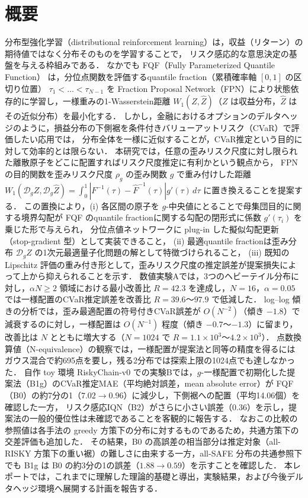 \documentclass[a4paper,10pt]{jsarticle}
\theoremstyle{definition}
\newcommand{\Wone}{W_1}
\newcommand{\Finv}{F^{-1}}
\newcommand{\Fhinv}{\hat{F}^{-1}}
\newcommand{\dist}{\mathcal{D}_g}
\begin{document}
\section*{概要}
分布型強化学習（distributional reinforcement learning）は，収益（リターン）の期待値ではなく分布そのものを学習することで，
リスク感応的な意思決定の基盤を与える枠組みである．
なかでも FQF（Fully Parameterized Quantile Function）\cite{yang2019fqf} は，分位点関数を評価するquantile fraction（累積確率軸 $[0, 1]$ の区切り位置）
$\tau_1<\dots<\tau_{N-1}$ を Fraction Proposal Network（FPN）により状態依存的に学習し，一様重みの1-Wasserstein距離 $\Wone(Z,\hat{Z})$（$Z$ は収益分布，$\hat{Z}$ はその近似分布）を最小化する．
しかし，金融におけるオプションのデルタヘッジのように，損益分布の下側裾を条件付きバリューアットリスク（CVaR）で評価したい応用では，
分布全体を一様に近似することが，CVaR推定という目的に対して効率的とは限らない．
本研究では，任意の歪みリスク尺度に対し限られた離散原子をどこに配置すればリスク尺度推定に有利かという観点から，
FPNの目的関数を歪みリスク尺度 $\rho_g$ の歪み関数 $g$ で重み付けした距離
$\Wone(\dist Z,\dist\hat{Z})=\int_0^1|\Finv(\tau)-\Fhinv(\tau)|g'(\tau)\,d\tau$ に置き換えることを提案する．
この置換により，(i) 各区間の原子を $g$-中央値にとることで母集団目的に関する境界勾配が FQF のquantile fractionに関する勾配の閉形式に係数 $g'(\tau_i)$ を乗じた形で与えられ，
分位点値ネットワークに plug-in した擬似勾配更新（stop-gradient 型）として実装できること，
(ii) 最適quantile fractionは歪み分布 $\dist Z$ の1次元最適量子化問題の解として特徴づけられること，
(iii) 既知の Lipschitz 評価の重み付き形として，歪みリスク尺度の推定誤差が提案損失によって上から抑えられることを示す．
数値実験Aでは，3つのヘビーテイル分布に対し，$\alpha N\ge2$ 領域における最小改善比 $R=42.3$ を達成し，$N=16$，$ \alpha=0.05$ では一様配置のCVaR推定誤差を改善比 $R=39.6$〜$97.9$ で低減した．
log--log 傾きの分析では，歪み最適配置の符号付きCVaR誤差が $O(N^{-2})$（傾き $-1.8$）で減衰するのに対し，一様配置は $O(N^{-1})$ 程度（傾き $-0.7$〜$-1.3$）に留まり，改善比は $N$ とともに増大する（$N=1024$ で $R=1.1\times10^3$〜$4.2\times10^3$）．
点数換算値（N-equivalence）の観察では，一様配置が提案法と同等の精度を得るにはガウス混合で約695点を要し，残る2分布では探索上限の1024点でも達しなかった．
自作 toy 環境 RiskyChain-v0 での実験Bでは，$g$-一様配置で初期化した提案法（B1g）のCVaR推定MAE（平均絶対誤差，mean absolute error）が
FQF（B0）の約7分の1（$7.02\to0.96$）に減少し，下側裾への配置（平均14.06個）を確認した一方，
リスク感応IQN（B2）がさらに小さい誤差（$0.36$）を示し，提案法の一般的優位性は未確認であることを客観的に報告する．
なおこの比較の参照値は各手法の greedy 方策下の分布に対するものであるため，共通方策下の交差評価も追加した．
その結果，B0 の高誤差の相当部分は推定対象（all-RISKY 方策下の重い裾）の難しさに由来する一方，all-SAFE 分布の共通参照下でも B1g は B0 の約3分の1の誤差（$1.88\to0.59$）を示すことを確認した．
本レポートでは，これまでに理解した理論的基礎と導出，実験結果，および今後デルタヘッジ環境へ展開する計画を報告する．
\end{document}

